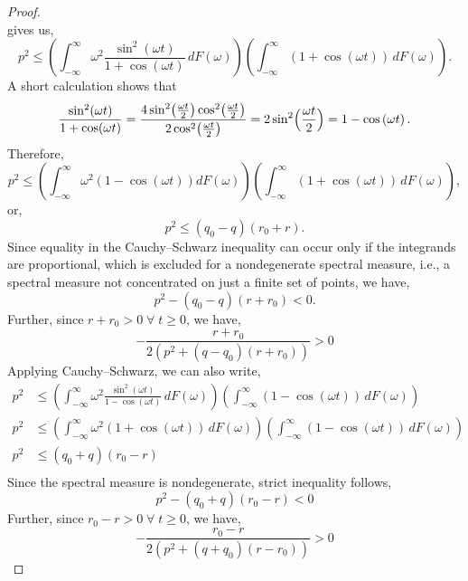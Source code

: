 \documentclass[10pt,a4paper]{amsart}
\begin{document}
\begin{proof}
\begin{equation}
\end{equation}
gives us,
\begin{equation}
    p^2\le \left(\int_{-\infty}^{\infty}\omega^2\frac{\sin^2(\omega t)}{1+\cos(\omega t)}\,dF(\omega)\right)
    \left(\int_{-\infty}^{\infty}(1+\cos(\omega t))\,dF(\omega)\right).
\end{equation}
A short calculation shows that
\begin{equation}
    \frac{\sin^2(\omega t)}{1+\cos(\omega t)}
    =\frac{4\sin^2\bigl(\frac{\omega t}{2}\bigr)\cos^2\bigl(\frac{\omega t}{2}\bigr)}
    {2\cos^2\bigl(\frac{\omega t}{2}\bigr)}
    =2\sin^2\Bigl(\frac{\omega t}{2}\Bigr) = 1 - \cos\left(\omega t\right).
\end{equation}
Therefore,
\begin{equation}
    p^2\le \left(\int_{-\infty}^{\infty}\omega^2\left(1 - \cos\left(\omega t\right)\right)dF(\omega)\right)\left(\int_{-\infty}^{\infty}(1+\cos(\omega t))\,dF(\omega)\right),
\end{equation}
or,
\begin{equation}
    p^2 \leq \left(q_0-q\right) \left(r_0+r\right).
\end{equation}
Since equality in the Cauchy--Schwarz inequality can occur only if the integrands are proportional, which is excluded for a nondegenerate spectral measure, i.e., a spectral measure not concentrated on just a finite set of points, we have,
\begin{equation}
    p^2-(q_0-q)(r+r_0)<0.
\end{equation}
Further, since $r+r_0>0\; \forall \;t \geq 0$, we have,
\begin{equation}
 -\frac{r+r_0}{2\left(p^2+(q-q_0)(r+r_0)\right)} > 0 
\end{equation}
Applying Cauchy--Schwarz, we can also write,
\begin{equation}
\begin{split}
    p^2 &\leq \left(\int_{-\infty}^{\infty}\omega^2\frac{\sin^2(\omega t)}{1-\cos(\omega t)}\,dF(\omega)\right)
    \left(\int_{-\infty}^{\infty}(1-\cos(\omega t))\,dF(\omega)\right) \\
    p^2 &\leq \left(\int_{-\infty}^{\infty}\omega^2\left(1+\cos(\omega t)\right)\,dF(\omega)\right)
    \left(\int_{-\infty}^{\infty}(1-\cos(\omega t))\,dF(\omega)\right) \\
    p^2 &\leq \left(q_0+q\right)\left(r_0-r\right) \\
\end{split}
\end{equation}
Since the spectral measure is nondegenerate, strict inequality follows,
\begin{equation}
    p^2 -\left(q_0+q\right)\left(r_0-r\right) < 0
\end{equation}
Further, since $r_0-r>0\; \forall \;t \geq 0$, we have,
\begin{equation}
 -\frac{r_0-r}{2\left(p^2+(q+q_0)(r-r_0)\right)} > 0 
\end{equation}
\end{proof}
\end{document}

